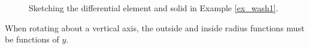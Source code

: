 \begin{figure}[t]
\centering
\qquad
{}
\qquad
{}
\caption{Sketching the differential element and solid in Example \ref{ex_wash1}.}
\end{figure}


When rotating about a vertical axis, the outside and inside radius functions must be functions of $y$.\\

